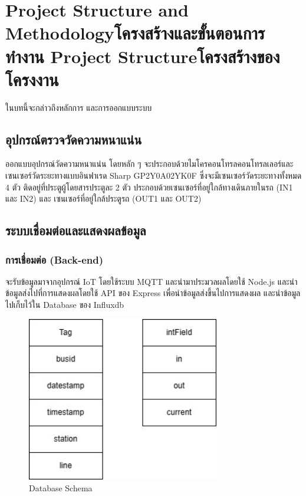 \chapter{\ifproject%
\ifenglish Project Structure and Methodology\else โครงสร้างและขั้นตอนการทำงาน\fi
\else%
\ifenglish Project Structure\else โครงสร้างของโครงงาน\fi
\fi
}

ในบทนี้จะกล่าวถึงหลักการ และการออกแบบระบบ

\section{อุปกรณ์ตรวจวัดความหนาแน่น}
ออกแบบอุปกรณ์วัดความหนาแน่น โดยหลัก ๆ จะประกอบด้วยไมโครคอนโทรลคอนโทรลเลอร์และเซนเซอร์วัดระยะทางแบบอินฟาเรด Sharp GP2Y0A02YK0F ซึ่งจะมีเซนเซอร์วัดระยะทางทั้งหมด 4 ตัว ติดอยู่ที่ประตูผู้โดยสารประตูละ 2 ตัว ประกอบด้วยเซนเซอร์ที่อยู่ใกล้ทางเดินภายในรถ (IN1 และ IN2) และ เซนเซอร์ที่อยู่ใกล้ประตูรถ (OUT1 และ OUT2) 


\section{ระบบเชื่อมต่อและแสดงผลข้อมูล}

\subsection{การเชื่อมต่อ (Back-end)}
จะรับข้อมูลมาจากอุปกรณ์ IoT โดยใช้ระบบ MQTT และนำมาประมวลผลโดยใช้ Node.js และนำข้อมูลส่งไปที่การแสดงผลโดยใช้ API ของ Express เพื่อนำข้อมูลส่งขึ้นไปการแสดงผล และนำข้อมูลไปเก็บไว้ใน Database ของ Influxdb

\begin{figure}[h!]
    \begin{center}
      \includegraphics[width=0.75\textwidth]{dbschema.jpg}
    \end{center}
    \caption[Poem]{Database Schema}
    \label{fig:dbschema}
  \end{figure}

